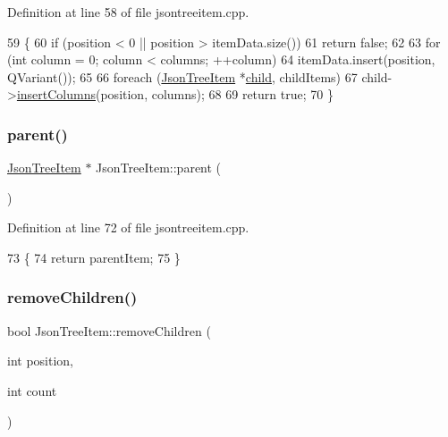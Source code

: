 Definition at line 58 of file jsontreeitem.\+cpp.


\begin{DoxyCode}
59 \{
60     \textcolor{keywordflow}{if} (position < 0 || position > itemData.size())
61         \textcolor{keywordflow}{return} \textcolor{keyword}{false};
62 
63     \textcolor{keywordflow}{for} (\textcolor{keywordtype}{int} column = 0; column < columns; ++column)
64         itemData.insert(position, QVariant());
65 
66     \textcolor{keywordflow}{foreach} (\hyperlink{class_json_tree_item}{JsonTreeItem} *\hyperlink{class_json_tree_item_a24864c7936a43d9059277a20497341b9}{child}, childItems)
67         child->\hyperlink{class_json_tree_item_a189b5b2926b94dc53f3aaa366cf66b05}{insertColumns}(position, columns);
68 
69     \textcolor{keywordflow}{return} \textcolor{keyword}{true};
70 \}
\end{DoxyCode}
\mbox{\label{class_json_tree_item_a1777c30033cacb28a800b34423dcee38}} 
\subsubsection{\texorpdfstring{parent()}{parent()}}
{\footnotesize\ttfamily \hyperlink{class_json_tree_item}{Json\+Tree\+Item} $\ast$ Json\+Tree\+Item\+::parent (\begin{DoxyParamCaption}{ }\end{DoxyParamCaption})}



Definition at line 72 of file jsontreeitem.\+cpp.


\begin{DoxyCode}
73 \{
74     \textcolor{keywordflow}{return} parentItem;
75 \}
\end{DoxyCode}
\mbox{\label{class_json_tree_item_a37ef4384835286e1afcc6f42de7b1c6a}} 
\subsubsection{\texorpdfstring{remove\+Children()}{removeChildren()}}
{\footnotesize\ttfamily bool Json\+Tree\+Item\+::remove\+Children (\begin{DoxyParamCaption}\item[{int}]{position,  }\item[{int}]{count }\end{DoxyParamCaption})}



